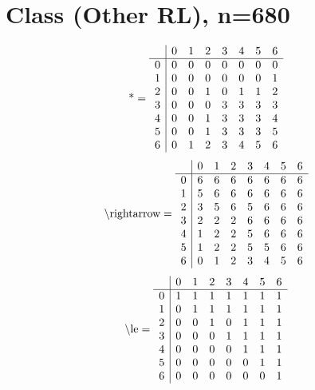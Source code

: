 \documentclass[11pt]{article}
\begin{document}
\section{Class (Other RL), n=680}
\[\text{*} = 
\begin{array}{r | r r r r r r r}
 & 0 & 1 & 2 & 3 & 4 & 5 & 6 \\ \hline
0 & 0 & 0 & 0 & 0 & 0 & 0 & 0 \\
1 & 0 & 0 & 0 & 0 & 0 & 0 & 1 \\
2 & 0 & 0 & 1 & 0 & 1 & 1 & 2 \\
3 & 0 & 0 & 0 & 3 & 3 & 3 & 3 \\
4 & 0 & 0 & 1 & 3 & 3 & 3 & 4 \\
5 & 0 & 0 & 1 & 3 & 3 & 3 & 5 \\
6 & 0 & 1 & 2 & 3 & 4 & 5 & 6 \\
\end{array}
\]
\[\text{\textbackslash rightarrow} = 
\begin{array}{r | r r r r r r r}
 & 0 & 1 & 2 & 3 & 4 & 5 & 6 \\ \hline
0 & 6 & 6 & 6 & 6 & 6 & 6 & 6 \\
1 & 5 & 6 & 6 & 6 & 6 & 6 & 6 \\
2 & 3 & 5 & 6 & 5 & 6 & 6 & 6 \\
3 & 2 & 2 & 2 & 6 & 6 & 6 & 6 \\
4 & 1 & 2 & 2 & 5 & 6 & 6 & 6 \\
5 & 1 & 2 & 2 & 5 & 5 & 6 & 6 \\
6 & 0 & 1 & 2 & 3 & 4 & 5 & 6 \\
\end{array}
\]
\[\text{\textbackslash le} = 
\begin{array}{r | r r r r r r r}
 & 0 & 1 & 2 & 3 & 4 & 5 & 6 \\ \hline
0 & 1 & 1 & 1 & 1 & 1 & 1 & 1 \\
1 & 0 & 1 & 1 & 1 & 1 & 1 & 1 \\
2 & 0 & 0 & 1 & 0 & 1 & 1 & 1 \\
3 & 0 & 0 & 0 & 1 & 1 & 1 & 1 \\
4 & 0 & 0 & 0 & 0 & 1 & 1 & 1 \\
5 & 0 & 0 & 0 & 0 & 0 & 1 & 1 \\
6 & 0 & 0 & 0 & 0 & 0 & 0 & 1 \\
\end{array}
\]
\end{document}
